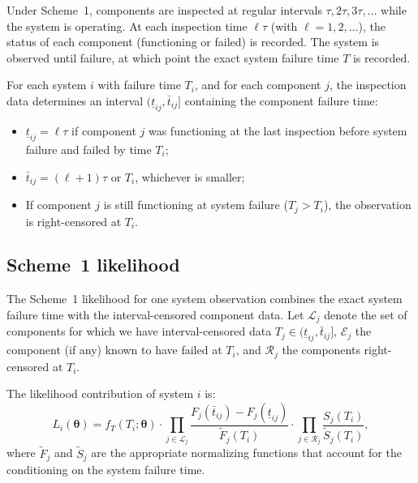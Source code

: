 \documentclass[12pt]{article}
\theoremstyle{definition}
\theoremstyle{remark}
\newcommand{\btheta}{\bm{\theta}}
\begin{document}
Under Scheme~1, components are inspected at regular intervals
$\tau, 2\tau, 3\tau, \ldots$ while the system is operating.  At
each inspection time $\ell\tau$ (with $\ell = 1, 2, \ldots$), the
status of each component (functioning or failed) is recorded.  The
system is observed until failure, at which point the exact system
failure time $T$ is recorded.

For each system $i$ with failure time $T_i$, and for each
component $j$, the inspection data determines an interval
$(\underline{t}_{ij}, \bar{t}_{ij}]$ containing the component
failure time:
\begin{itemize}
\item $\underline{t}_{ij} = \ell\tau$ if component $j$ was
  functioning at the last inspection before system failure and
  failed by time $T_i$;
\item $\bar{t}_{ij} = (\ell + 1)\tau$ or $T_i$, whichever is
  smaller;
\item If component $j$ is still functioning at system failure
  ($T_j > T_i$), the observation is right-censored at $T_i$.
\end{itemize}

\subsection{Scheme~1 likelihood}

The Scheme~1 likelihood for one system observation combines the
exact system failure time with the interval-censored component data.
Let $\mathcal{L}_j$ denote the set of components for which we have
interval-censored data $T_j \in (\underline{t}_{ij},
\bar{t}_{ij}]$, $\mathcal{E}_j$ the component (if any) known to
have failed at $T_i$, and $\mathcal{R}_j$ the components
right-censored at $T_i$.

The likelihood contribution of system $i$ is:
\begin{equation}\label{eq:scheme1-lik}
  L_i(\btheta) = f_T(T_i; \btheta)
  \cdot \prod_{j \in \mathcal{L}_j}
    \frac{F_j(\bar{t}_{ij}) - F_j(\underline{t}_{ij})}
         {\tilde{F}_j(T_i)}
  \cdot \prod_{j \in \mathcal{R}_j}
    \frac{S_j(T_i)}{\tilde{S}_j(T_i)},
\end{equation}
where $\tilde{F}_j$ and $\tilde{S}_j$ are the appropriate
normalizing functions that account for the conditioning on the
system failure time.
\end{document}
